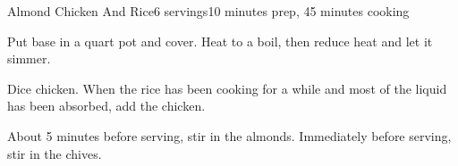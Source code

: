 \documentclass[../Cookbook.tex]{subfiles}
\begin{document}
\begin{recipe}{Almond Chicken And Rice}{6 servings}{10 minutes prep, 45 minutes cooking}

	Put base in a  quart pot and cover. Heat to a boil, then reduce heat and let it simmer.

	Dice chicken. When the rice has been cooking for a while and most of the liquid has been absorbed, add the chicken.

	About 5 minutes before serving, stir in the almonds. Immediately before serving, stir in the chives.

\end{recipe}
\end{document}
